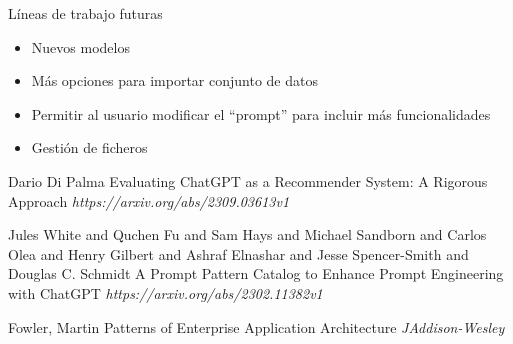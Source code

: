 \documentclass[aspectratio=169,xcolor=dvipsnames, t]{beamer}
\begin{document}
\begin{frame}{Líneas de trabajo futuras}
    \begin{itemize}
        \item Nuevos modelos
        \item Más opciones para importar conjunto de datos
        \item Permitir al usuario modificar el ``{prompt}'' para incluir más funcionalidades
        \item Gestión de ficheros
    \end{itemize}
\end{frame}

\begin{frame}{}
    \footnotesize{
        \begin{thebibliography}{99}
             Dario Di Palma
            \newblock Evaluating ChatGPT as a Recommender System: A Rigorous Approach
            \newblock \emph{https://arxiv.org/abs/2309.03613v1}

             Jules White and Quchen Fu and Sam Hays and Michael Sandborn and Carlos Olea and Henry Gilbert and Ashraf Elnashar and Jesse Spencer-Smith and Douglas C. Schmidt
            \newblock A Prompt Pattern Catalog to Enhance Prompt Engineering with ChatGPT
            \newblock \emph{https://arxiv.org/abs/2302.11382v1}
            
             Fowler, Martin
            \newblock Patterns of Enterprise Application Architecture
            \newblock \emph{JAddison-Wesley}
        \end{thebibliography}
    }
\end{frame}

\makefinalpage
\end{document}
